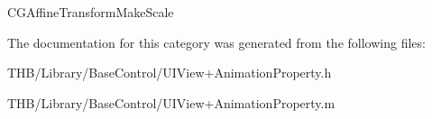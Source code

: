 C\+G\+Affine\+Transform\+Make\+Scale 

The documentation for this category was generated from the following files\+:\begin{DoxyCompactItemize}
\item 
T\+H\+B/\+Library/\+Base\+Control/U\+I\+View+\+Animation\+Property.\+h\item 
T\+H\+B/\+Library/\+Base\+Control/U\+I\+View+\+Animation\+Property.\+m\end{DoxyCompactItemize}

